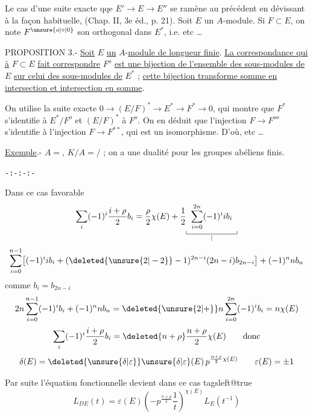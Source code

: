 Le cas d'une suite exacte qqe $E'\longrightarrow E\longrightarrow E''$ se ramène au précédent en dévissant à la façon habituelle, (Chap. II, 3e éd., p. 21). Soit $E$ un $A$-module. Si $F\subset E$, on note $F^{\unsure{o|\circ|0}}$ son orthogonal dans $E^\ast$, i.e. etc \ldots

PROPOSITION 3.- \uline{Soit} $E$ \uline{un} $A$-\uline{module de longueur finie}. \uline{La correspondance qui à} $F\subset E$ \uline{fait correspondre} $F^o$ \uline{est une bijection de l'ensemble des sous-modules de} $E$ \uline{sur celui des sous-modules de} $E^\ast$ ; \uline{cette bijection transforme somme en intersection et intersection en somme}.

On utilise la suite exacte $0\longrightarrow(E/F)^\ast\longrightarrow E^\ast\longrightarrow F^\ast\longrightarrow0$, qui montre que $F^\ast$ s'identifie à $E^\ast/F^o$ et $(E/F)^\ast$ à $F^o$. On en déduit que l'injection $F\longrightarrow F^{oo}$ s'identifie à l'injection $F\longrightarrow F^{\ast\ast}$, qui est un isomorphisme. D'où, etc \ldots

\uline{Exemple}.- $A={}$, $K/A={}$$/$ ; on a une dualité pour les groupes abéliens finis.

\centerline{\texttt{-:-:-:-}}


Dans ce cas favorable
\[
 \sum_i(-1)^i\frac{i+\rho}{2}b_i
 =\frac{\rho}{2}\chi(E)+\frac12
 \underset{\substack{\rule{0.4pt}{4pt}\rule{6em}{0.4pt}\rule{0.4pt}{4pt}\\ |}}
 {\sum_{i=0}^{2n}(-1)^i i b_i}
\]
\[
 \sum_{i=0}^{n-1}\bigl[(-1)^i i b_i+
 (\deleted{\unsure{2|-2}}-1)^{2n-i}(2n-i)b_{2n-i}\bigr]+(-1)^n n b_n
\]
comme $b_i=b_{2n-i}$
\[
 2n\sum_{i=0}^{n-1}(-1)^i b_i+(-1)^n n b_n
 =\deleted{\unsure{2|+}}n\sum_{i=0}^{2n}(-1)^i b_i=n\chi(E)
\]
\[
 \sum_i(-1)^i\frac{i+\rho}{2}b_i
 =\deleted{n+\rho}\frac{n+\rho}{2}\chi(E) \qquad \text{donc}
\]
\[
 \delta(E)=\deleted{\unsure{\delta|\varepsilon}}\unsure{\delta|\varepsilon}(E)\,
 p^{\frac{n+\rho}{2}\chi(E)}
 \qquad \varepsilon(E)=\pm1
\]

Par suite l'équation fonctionnelle devient dans ce cas
\begingroup\csname tagsleft@true\endcsname\[
 L_{DE}(t)=\varepsilon(E)\left(-p^{\frac{n+\rho}{2}}\frac{1}{t}\right)^{\chi(E)}
 L_E(t^{-1}) \tag*{(2)}
\]\endgroup


